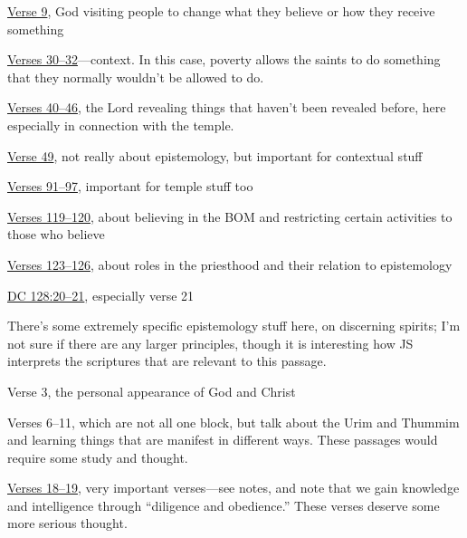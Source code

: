 \begin{compactdesc}
\begin{compactitem}
					\item \hyperref[DC124-9]{Verse 9}, God visiting people to change what they believe or how they receive something
					\item \hyperref[DC124-30]{Verses 30--32}---context. In this case, poverty allows the saints to do something that they normally wouldn't be allowed to do.
					\item \hyperref[DC124-40]{Verses 40--46}, the Lord revealing things that haven't been revealed before, here especially in connection with the temple.
					\item \hyperref[DC124-49]{Verse 49}, not really about epistemology, but important for contextual stuff
					\item \hyperref[DC124-91]{Verses 91--97}, important for temple stuff too
					\item \hyperref[DC124-119]{Verses 119--120}, about believing in the BOM and restricting certain activities to those who believe
					\item \hyperref[DC124-123]{Verses 123--126}, about roles in the priesthood and their relation to epistemology
				\end{compactitem}
			\item[{\hyperref[DC128]{DC 128}}]
				\begin{compactitem}
					\item \item\hyperref[DC128-20]{DC 128:20--21}, especially verse 21
				\end{compactitem}
			\item[{\hyperref[DC129]{DC 129}}]
				\begin{compactitem}
					\item There's some extremely specific epistemology stuff here, on discerning spirits; I'm not sure if there are any larger principles, though it is interesting how JS interprets the scriptures that are relevant to this passage.
				\end{compactitem}
			\item[{\hyperref[DC130]{DC 130}}]
				\begin{compactitem}
					\item Verse 3, the personal appearance of God and Christ
					\item Verses 6--11, which are not all one block, but talk about the Urim and Thummim and learning things that are manifest in different ways. These passages would require some study and thought.
					\item \hyperref[DC130-18]{Verses 18--19}, very important verses---see notes, and note that we gain knowledge and intelligence through ``diligence and obedience.'' These verses deserve some more serious thought.

\end{compactitem}
\end{compactdesc}
